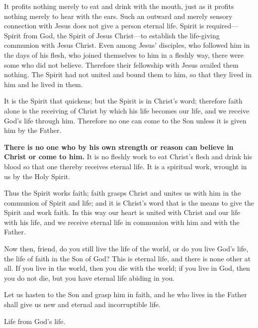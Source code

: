 It profits nothing merely to eat and drink with the mouth, just as it profits nothing merely to hear with the ears. Such an outward and merely sensory connection with Jesus does not give a person eternal life. Spirit is required—Spirit from God, the Spirit of Jesus Christ—to establish the life-giving communion with Jesus Christ. Even among Jesus’ disciples, who followed him in the days of his flesh, who joined themselves to him in a fleshly way, there were some who did not believe. Therefore their fellowship with Jesus availed them nothing. The Spirit had not united and bound them to him, so that they lived in him and he lived in them.

It is the Spirit that quickens; but the Spirit is in Christ’s word; therefore faith alone is the receiving of Christ by which his life becomes our life, and we receive God’s life through him. Therefore no one can come to the Son unless it is given him by the Father.

\textbf{There is no one who by his own strength or reason can believe in Christ or come to him.} It is no fleshly work to eat Christ’s flesh and drink his blood so that one thereby receives eternal life. It is a spiritual work, wrought in us by the Holy Spirit.

Thus the Spirit works faith; faith grasps Christ and unites us with him in the communion of Spirit and life; and it is Christ’s word that is the means to give the Spirit and work faith. In this way our heart is united with Christ and our life with his life, and we receive eternal life in communion with him and with the Father.

Now then, friend, do you still live the life of the world, or do you live God’s life, the life of faith in the Son of God? This is eternal life, and there is none other at all. If you live in the world, then you die with the world; if you live in God, then you do not die, but you have eternal life abiding in you.

Let us hasten to the Son and grasp him in faith, and he who lives in the Father shall give us new and eternal and incorruptible life.

Life from God’s life.

